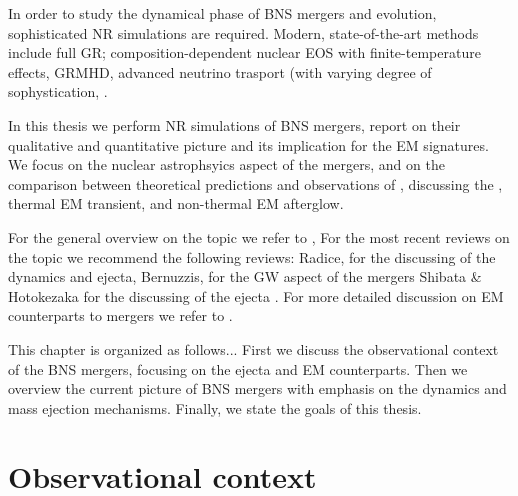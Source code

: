 In order to study the dynamical phase of \ac{BNS} mergers and \pmerg{} evolution, 
sophisticated \ac{NR} simulations are required. Modern, state-of-the-art methods 
include full \ac{GR}; composition-dependent nuclear \ac{EOS} with finite-temperature 
effects, \ac{GRMHD}, advanced neutrino trasport (with varying degree of sophystication,
\cite{14, 15, 16, 17, 18, 19, 20, 21}.

In this thesis we perform \ac{NR} simulations of \ac{BNS} mergers, report on their 
qualitative and quantitative picture and its implication for the \ac{EM} signatures.
We focus on the nuclear astrophsyics aspect of the mergers, and on the comparison 
between theoretical predictions and observations of \GW{}, discussing the 
\rproc{} \nuc{}, thermal \ac{EM} transient, and non-thermal \ac{EM} afterglow. 

For the general overview on the topic we refer to \cite{22},
For the most recent reviews on the topic we recommend the following reviews:
Radice, for the discussing of the \pmerg{} dynamics and ejecta,
Bernuzzis, for the \ac{GW} aspect of the mergers \cite{Bernuzzi}
Shibata & Hotokezaka for the discussing of the ejecta \cite{Shibata & Hotokezaka}.
For more detailed discussion on \ac{EM} counterparts to mergers we refer to \cite{23,24,25}.

This chapter is organized as follows...
First we discuss the observational context of the \ac{BNS} mergers, focusing on the 
ejecta \nuc{} and \ac{EM} counterparts.
Then we overview the current picture of \ac{BNS} mergers with emphasis on the 
\pmerg{} dynamics and mass ejection mechanisms. 
Finally, we state the goals of this thesis.




\section{Observational context}



\subsection{\rproc{} \nuc{}}\label{sec:nuc:rproc}

%


